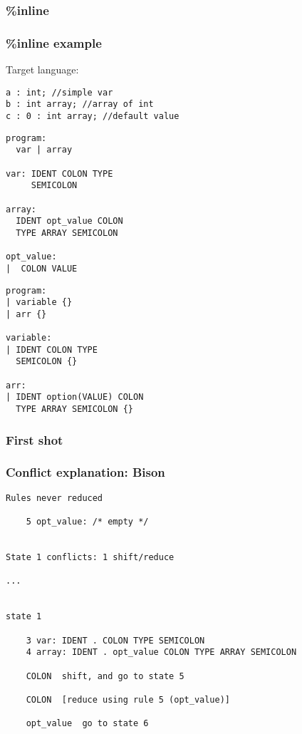 \begin{frame}
  \frametitle{\%inline}
  \usebox{\codebox}
\end{frame}


\begin{frame}[fragile]
  \frametitle{\%inline example}
  Target language:
  \begin{verbatim}
a : int; //simple var
b : int array; //array of int
c : 0 : int array; //default value
\end{verbatim}
\end{frame}

\lstset{basicstyle=\ttfamily\scriptsize}

\begin{lrbox}{\codebox}
  \begin{tcolorbox}[title=\centering{First shot}\\Bison\hspace{0.45\linewidth} Menhir,sidebyside]%
  \begin{lstlisting}
program:
  var | array

var: IDENT COLON TYPE
     SEMICOLON

array:
  IDENT opt_value COLON
  TYPE ARRAY SEMICOLON

opt_value:
|  COLON VALUE
\end{lstlisting}
\tcblower%
  \begin{lstlisting}
program:
| variable {}
| arr {}

variable:
| IDENT COLON TYPE
  SEMICOLON {}

arr:
| IDENT option(VALUE) COLON
  TYPE ARRAY SEMICOLON {}
  \end{lstlisting}
  \end{tcolorbox}
\end{lrbox}

\begin{frame}
  \frametitle{First shot}
  \usebox{\codebox}
\end{frame}

\begin{frame}[fragile]
  \frametitle{Conflict explanation: Bison}
  \begin{lstlisting}
Rules never reduced

    5 opt_value: /* empty */


State 1 conflicts: 1 shift/reduce

...


state 1

    3 var: IDENT . COLON TYPE SEMICOLON
    4 array: IDENT . opt_value COLON TYPE ARRAY SEMICOLON

    COLON  shift, and go to state 5

    COLON  [reduce using rule 5 (opt_value)]

    opt_value  go to state 6
    \end{lstlisting}
\end{frame}


